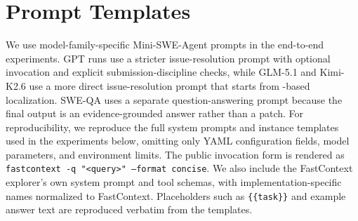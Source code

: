 \section{Prompt Templates}
\label{app:prompt-templates}

We use model-family-specific Mini-SWE-Agent prompts in the end-to-end experiments.
GPT runs use a stricter issue-resolution prompt with optional \approach invocation and explicit submission-discipline checks, while GLM-5.1 and Kimi-K2.6 use a more direct issue-resolution prompt that starts from \approach-based localization.
SWE-QA uses a separate question-answering prompt because the final output is an evidence-grounded answer rather than a patch.
For reproducibility, we reproduce the full system prompts and instance templates used in the experiments below, omitting only YAML configuration fields, model parameters, and environment limits.
The public invocation form is rendered as \texttt{fastcontext -q "<query>" --format concise}.
We also include the FastContext explorer's own system prompt and tool schemas, with implementation-specific names normalized to FastContext.
Placeholders such as \texttt{\{\{task\}\}} and example answer text are reproduced verbatim from the templates.


